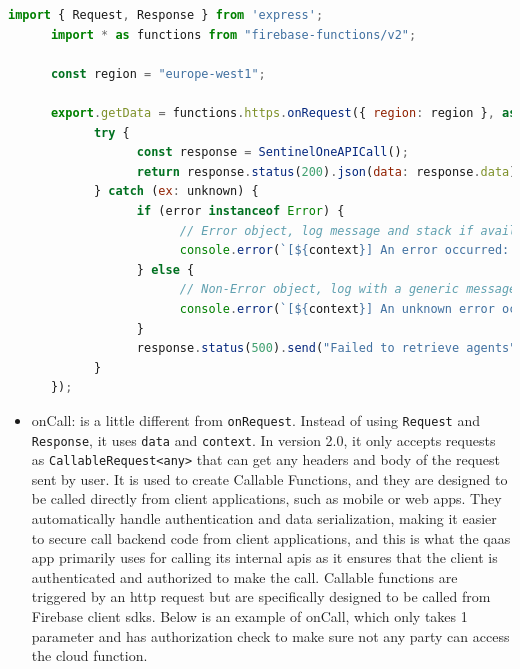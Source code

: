 \begin{lstlisting}[language=JavaScript, caption=Example of a typical onRequest function]
      import { Request, Response } from 'express';
      import * as functions from "firebase-functions/v2";

      const region = "europe-west1";

      export.getData = functions.https.onRequest({ region: region }, async (request: Request, response: Response): Promise<any> => {
            try {
                  const response = SentinelOneAPICall();
                  return response.status(200).json(data: response.data);
            } catch (ex: unknown) {
                  if (error instanceof Error) {
                        // Error object, log message and stack if available
                        console.error(`[${context}] An error occurred: ${error.message} \n Stack: ${error.stack}`);
                  } else {
                        // Non-Error object, log with a generic message.
                        console.error(`[${context}] An unknown error occurred:`, error);
                  }
                  response.status(500).send("Failed to retrieve agents");
            }
      });
\end{lstlisting}

\begin{itemize}
      \item onCall: is a little different from  \texttt{onRequest}. Instead of using \texttt{Request} and \texttt{Response}, it
            uses \texttt{data} and \texttt{context}. In version 2.0, it only accepts requests as \texttt{CallableRequest<any>} that can get
            any headers and body of the request sent by user. It is used to create Callable Functions, and they are designed to be called
            directly from client applications, such as mobile or web apps. They automatically handle authentication and data serialization,
            making it easier to secure call backend code from client applications, and this is what the \acrshort{qaas} app
            primarily uses for calling its internal \acrshort{api}s as it ensures that the client is authenticated and authorized
            to make the call. Callable functions are triggered by an \acrshort{http} request but are specifically designed to be
            called from Firebase client \acrshort{sdk}s. Below is an example of onCall, which only takes 1 parameter and has authorization
            check to make sure not any party can access the cloud function.
\end{itemize}


